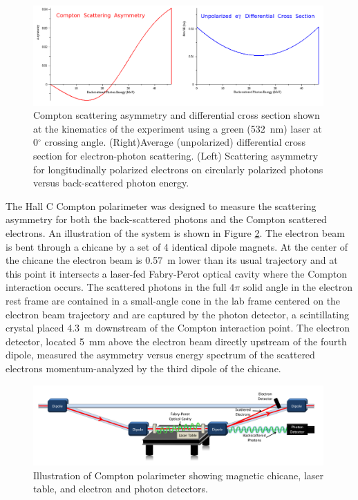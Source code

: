 \begin{figure}[ht]
\centering
\includegraphics[width=0.99\textwidth]{Pictures/compton_cx.png}
\caption{Compton scattering asymmetry and differential cross section shown at the kinematics of the \Qs experiment using a green (532~nm) laser at 0$^{\circ}$ crossing angle. (Right)Average (unpolarized) differential cross section for electron-photon scattering. (Left) Scattering asymmetry for longitudinally polarized electrons on circularly polarized photons versus back-scattered photon energy. }
\label{fig:compton_cx}
\end{figure}
The Hall C Compton polarimeter was designed to measure the scattering asymmetry for both the back-scattered photons and the Compton scattered electrons. An illustration of the system is shown in Figure \ref{fig:compton_layout}. The electron beam is bent through a chicane by a set of 4 identical dipole magnets. At the center of the chicane the electron beam is 0.57~m lower than its usual trajectory and at this point it intersects a laser-fed Fabry-Perot optical cavity where the Compton interaction occurs. The scattered photons in the full $4\pi$ solid angle in the electron rest frame are contained in a small-angle cone in the lab frame centered on the electron beam trajectory and are captured by the photon detector, a scintillating crystal placed 4.3~m downstream of the Compton interaction point. The electron detector, located 5~mm above the electron beam directly upstream of the fourth dipole, measured the asymmetry versus energy spectrum of the scattered electrons momentum-analyzed by the third dipole of the chicane.
\begin{figure}[ht]
\centering
\includegraphics[width=0.99\textwidth]{Pictures/Compton_layout.pdf}
\caption{Illustration of Compton polarimeter showing magnetic chicane, laser table, and electron and photon detectors. }
\label{fig:compton_layout}
\end{figure}
